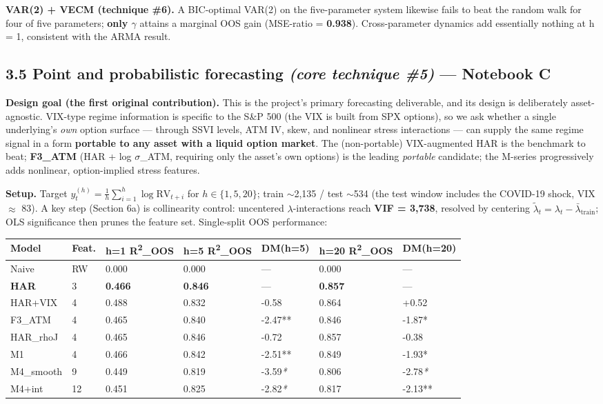 \documentclass[10pt,a4paper]{article}
\begin{document}
\textbf{VAR(2) + VECM (technique \#6).} A BIC-optimal VAR(2) on the five-parameter system likewise fails to beat the random walk for four of five parameters; \textbf{only $\gamma$} attains a marginal OOS gain (MSE-ratio = \textbf{0.938}). Cross-parameter dynamics add essentially nothing at h = 1, consistent with the ARMA result.

\subsection*{3.5 Point and probabilistic forecasting \textit{(core technique \#5)} --- Notebook C}

\textbf{Design goal (the first original contribution).} This is the project's primary forecasting deliverable, and its design is deliberately asset-agnostic. VIX-type regime information is specific to the S\&P 500 (the VIX is built from SPX options), so we ask whether a single underlying's \textit{own} option surface --- through SSVI levels, ATM IV, skew, and nonlinear stress interactions --- can supply the same regime signal in a form \textbf{portable to any asset with a liquid option market}. The (non-portable) VIX-augmented HAR is the benchmark to beat; \textbf{F3\_ATM} (HAR + log $\sigma$\_ATM, requiring only the asset's own options) is the leading \textit{portable} candidate; the M-series progressively adds nonlinear, option-implied stress features.

\textbf{Setup.} Target $y_t^{(h)} = \tfrac{1}{h}\sum_{i=1}^h \log\text{RV}_{t+i}$ for $h\in\{1,5,20\}$; train $\sim$2,135 / test $\sim$534 (the test window includes the COVID-19 shock, VIX $\approx$ 83). A key step (Section 6a) is collinearity control: uncentered $\lambda$-interactions reach \textbf{VIF = 3,738}, resolved by centering $\tilde\lambda_t=\lambda_t-\bar\lambda_\text{train}$; OLS significance then prunes the feature set. Single-split OOS performance:

\begin{center}\footnotesize
\begin{tabularx}{\textwidth}{l Y Y Y Y Y Y}
\toprule
\textbf{Model} & \textbf{Feat.} & \textbf{h=1 R\textsuperscript{2}\_OOS} & \textbf{h=5 R\textsuperscript{2}\_OOS} & \textbf{DM(h=5)} & \textbf{h=20 R\textsuperscript{2}\_OOS} & \textbf{DM(h=20)} \\
\midrule
Naive & RW & 0.000 & 0.000 & --- & 0.000 & --- \\
\textbf{HAR} & 3 & \textbf{0.466} & \textbf{0.846} & --- & \textbf{0.857} & --- \\
HAR+VIX & 4 & 0.488 & 0.832 & -0.58 & 0.864 & +0.52 \\
F3\_ATM & 4 & 0.465 & 0.840 & -2.47** & 0.846 & -1.87* \\
HAR\_rhoJ & 4 & 0.465 & 0.846 & -0.72 & 0.857 & -0.38 \\
M1 & 4 & 0.466 & 0.842 & -2.51** & 0.849 & -1.93* \\
M4\_smooth & 9 & 0.449 & 0.819 & -3.59\textit{*} & 0.806 & -2.78\textit{*} \\
M4+int & 12 & 0.451 & 0.825 & -2.82\textit{*} & 0.817 & -2.13** \\
\bottomrule
\end{tabularx}
\end{center}
\end{document}
